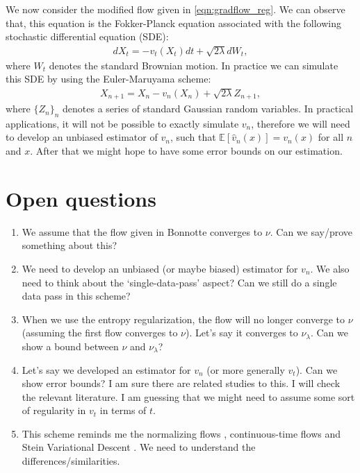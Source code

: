 \documentclass{article}
\begin{document}
We now consider the modified flow given in \eqref{eqn:gradflow_reg}. We can observe that, this equation is the Fokker-Planck equation associated with the following stochastic differential equation (SDE):
\begin{align}
d X_t = - v_t(X_t) dt + \sqrt{2 \lambda } d W_t,
\end{align}
where $W_t$ denotes the standard Brownian motion. In practice we can simulate this SDE by using the Euler-Maruyama scheme:
\begin{align}
X_{n+1} = X_n - v_n(X_n) + \sqrt{2 \lambda} Z_{n+1},
\end{align}
where $\{Z_n\}_{n}$ denotes a series of standard Gaussian random variables. In practical applications, it will not be possible to exactly simulate $v_n$, therefore we will need to develop an unbiased estimator of $v_n$, such that $\mathbb{E}[\hat{v}_n (x)] = v_n(x)$ for all $n$ and $x$. After that we might hope to have some error bounds on our estimation. 


\section{Open questions}

\begin{enumerate}
\item We assume that the flow given in Bonnotte converges to $\nu$. Can we say/prove something about this?
\item We need to develop an unbiased (or maybe biased) estimator for $v_n$. We also need to think about the `single-data-pass' aspect? Can we still do a single data pass in this scheme?
\item When we use the entropy regularization, the flow will no longer converge to $\nu$ (assuming the first flow converges to $\nu$). Let's say it converges to $\nu_\lambda$. Can we show a bound between $\nu$ and $\nu_\lambda$?
\item Let's say we developed an estimator for $v_n$ (or more generally $v_t$). Can we show error bounds? I am sure there are related studies to this. I will check the relevant literature. I am guessing that we might need to assume some sort of regularity in $v_t$ in terms of $t$.
\item This scheme reminds me the normalizing flows \cite{rezende2015variational}, continuous-time flows \cite{chen2018cont} and Stein Variational Descent \cite{liu2016stein,liu2017stein}. We need to understand the differences/similarities.
\end{enumerate}




\end{document}
